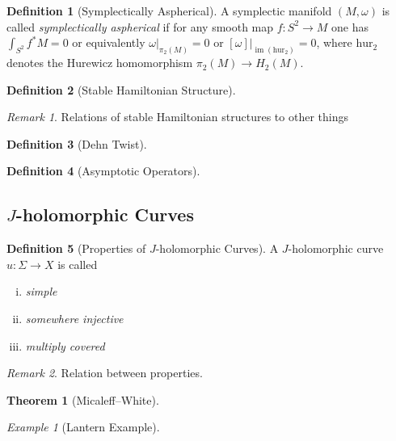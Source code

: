 \documentclass[a4paper]{article}
\newcommand{\si}{\Sigma}
\newcommand{\lra}{\longrightarrow}
\theoremstyle{definition}
\newtheorem{thm}{Theorem}
\theoremstyle{definition}
\newtheorem{definition}{Definition}
\theoremstyle{remark}
\newtheorem{rmk}{Remark}
\theoremstyle{remark}
\theoremstyle{remark}
\newtheorem{ex}{Example}
\begin{document}
\begin{definition}[Symplectically Aspherical]
  A symplectic manifold $(M,\omega)$ is called \emph{symplectically aspherical} if for any smooth map $f:S^2\lra M$ one has $\int_{S^2}f^*M=0$ or equivalently $\omega|_{\pi_2(M)}=0$ or $[\omega]|_{\operatorname{im}(\text{hur}_2)}=0$, where $\text{hur}_2$ denotes the Hurewicz homomorphism $\pi_2(M)\lra H_2(M)$.
\end{definition}

\begin{definition}[Stable Hamiltonian Structure]
  
\end{definition}

\begin{rmk}
  Relations of stable Hamiltonian structures to other things
\end{rmk}

\begin{definition}[Dehn Twist]
  
\end{definition}

\begin{definition}[Asymptotic Operators]
  
\end{definition}

\subsection{$J$-holomorphic Curves}

\begin{definition}[Properties of $J$-holomorphic Curves]
A $J$-holomorphic curve $u:\si\lra X$ is called
  \begin{enumerate}[(i)]
    \item \emph{simple}
    \item \emph{somewhere injective}
    \item \emph{multiply covered}
  \end{enumerate}
\end{definition}

\begin{rmk}
  Relation between properties.
\end{rmk}

\begin{thm}[Micaleff--White]
  
\end{thm}

\begin{ex}[Lantern Example]
  
\end{ex}
\end{document}
